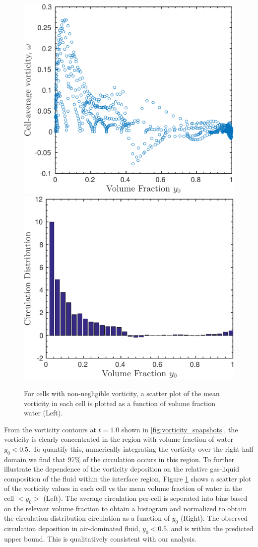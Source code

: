 \begin{figure}[h]
  \centering
  \includegraphics[width=.48\textwidth]{./figs/lung_figs/vorticity_vs_y0} \hfill
  \includegraphics[width=.48\textwidth]{./figs/lung_figs/circ_y0_dist2}
  \caption{For cells with non-negligible vorticity, a scatter plot of the mean vorticity in each cell is plotted as a function of volume fraction water (Left).  }
  \label{fig:baroclinic_y0_distribution}  
\end{figure}

From the vorticity contours at $t=1.0$ shown in
\ref{fig:vorticity_snapshots}, the vorticity is clearly concentrated
in the region with volume fraction of water $y_0<0.5$. To quantify
this, numerically integrating the vorticity over the right-half domain
we find that 97\% of the circulation occurs in this region. To further
illustrate the dependence of the vorticity deposition on the relative
gas-liquid composition of the fluid within the interface region,
Figure \ref{fig:baroclinic_y0_distribution} shows a scatter plot of
the vorticity values in each cell vs the mean volume fraction of water
in the cell $<y_0>$ (Left). The average circulation per-cell is
seperated into bins based on the relevant volume fraction to obtain a
histogram and normalized to obtain the circulation distribution
circulation as a function of $y_0$ (Right). The observed circulation
deposition in air-dominated fluid, $y_0<0.5$, and is within the
predicted upper bound. This is qualitatively consistent with our
analysis.
% 
% 
